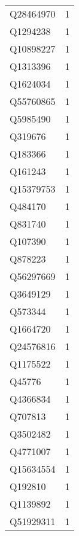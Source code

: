 \begin{tabular}{lr}
   Q28464970 &                             1 \\
    Q1294238 &                             1 \\
   Q10898227 &                             1 \\
    Q1313396 &                             1 \\
    Q1624034 &                             1 \\
   Q55760865 &                             1 \\
    Q5985490 &                             1 \\
     Q319676 &                             1 \\
     Q183366 &                             1 \\
     Q161243 &                             1 \\
   Q15379753 &                             1 \\
     Q484170 &                             1 \\
     Q831740 &                             1 \\
     Q107390 &                             1 \\
     Q878223 &                             1 \\
   Q56297669 &                             1 \\
    Q3649129 &                             1 \\
     Q573344 &                             1 \\
    Q1664720 &                             1 \\
   Q24576816 &                             1 \\
    Q1175522 &                             1 \\
      Q45776 &                             1 \\
    Q4366834 &                             1 \\
     Q707813 &                             1 \\
    Q3502482 &                             1 \\
    Q4771007 &                             1 \\
   Q15634554 &                             1 \\
     Q192810 &                             1 \\
    Q1139892 &                             1 \\
   Q51929311 &                             1 \\

\end{tabular}

